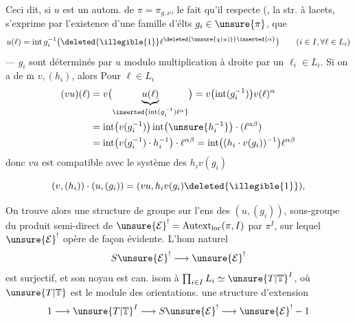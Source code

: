 Ceci dit, si $u$ est un autom. de $\pi=\pi_{g,\nu}$, le fait qu'il respecte (,  la str. à lacets, s'exprime par l'existence d'une famille d'élts $g_i\in\unsure{\pi}$,  que
\[
u(\ell)=\operatorname{int}g_i^{-1}\bigl(\deleted{\illegible{1}}\ell^{\deleted{\unsure{\chi(u)}}\inserted{\alpha}}\bigr)
\qquad(i\in I,\forall\ell\in L_i)
\]
---  $g_i$ sont déterminés par $u$  modulo multiplication à droite par un $\ell_i\in L_i$. Si on a de $\overline{\mathrm m}$ $v,(h_i)$, alors  Pour $\ell\in L_i$ 
\[
\begin{aligned}
(vu)(\ell)
&=v\bigl(\underbrace{u(\ell)}_{\inserted{\operatorname{int}(g_i^{-1})\ell^{\alpha}}}\bigr)
=v\bigl(\operatorname{int}(g_i^{-1})\bigr)v(\ell)^{\alpha}\\
&=\operatorname{int}\bigl(v(g_i^{-1})\bigr)\operatorname{int}\bigl(\unsure{h_i^{-1}}\bigr)\cdot(\ell^{\alpha\beta})\\
&=\operatorname{int}\bigl(v(g_i^{-1})\cdot h_i^{-1}\bigr)\cdot\ell^{\alpha\beta}
=\operatorname{int}\bigl((h_i\cdot v(g_i))^{-1}\bigr)\ell^{\alpha\beta}
\end{aligned}
\]
donc $vu$ est compatible avec le système des  $h_i v(g_i)$ 


\[
(v,(h_i))\cdot(u,(g_i))=(vu,h_i v(g_i)\deleted{\illegible{1}}),
\]

On trouve alors une structure de groupe sur l'ens  des $(u,(g_i))$, sous-groupe du produit semi-direct de $\unsure{\mathcal E}^{!}=\mathrm{Autext}_{\mathrm{loc}}(\pi,I)$  par $\pi^I$, sur lequel $\unsure{\mathcal E}^{!}$ opère de façon évidente. L'hom naturel
\[
S\unsure{\mathcal E}^{!}\longrightarrow\unsure{\mathcal E}^{!}
\]
est surjectif, et son noyau est can. isom à $\prod_{i\in I} L_i\simeq \unsure{T|\mathbb T}^I$, où $\unsure{T|\mathbb T}$ est le module des orientations.
 une structure d'extension 
\[
1\longrightarrow \unsure{T|\mathbb T}^I\longrightarrow S\unsure{\mathcal E}^{!}\longrightarrow\unsure{\mathcal E}^{!}-1
\]

